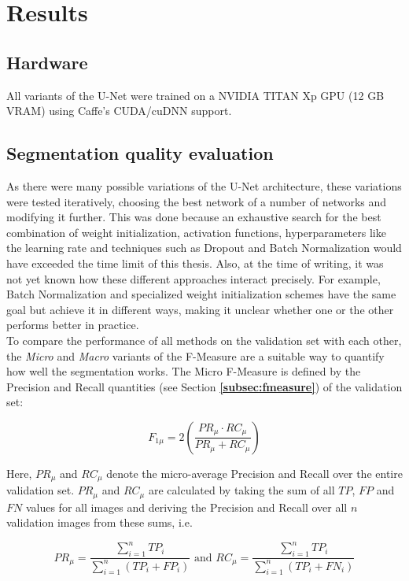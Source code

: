 \chapter {Results}
\label{chap:results}

	\section{Hardware}
All variants of the U-Net were trained on a NVIDIA TITAN Xp GPU (12 GB VRAM) using Caffe's CUDA/cuDNN support.

	\section {Segmentation quality evaluation}

\noindent As there were many possible variations of the U-Net architecture, these variations were tested iteratively, choosing the best network of a number of networks and modifying it further. This was done because an exhaustive search for the best combination of weight initialization, activation functions, hyperparameters like the learning rate and techniques such as Dropout and Batch Normalization would have exceeded the time limit of this thesis. Also, at the time of writing, it was not yet known how these different approaches interact precisely. For example, Batch Normalization and specialized weight initialization schemes have the same goal but achieve it in different ways, making it unclear whether one or the other performs better in practice.\\

\noindent To compare the performance of all methods on the validation set with each other, the \textit{Micro} and \textit{Macro} variants of the F-Measure \cite{micromacro} are a suitable way to quantify how well the segmentation works. The Micro F-Measure is defined by the Precision and Recall quantities (see Section \textbf{\ref{subsec:fmeasure}}) of the validation set:

\[ F_{1\mu} = 2 \left ( \frac{PR_\mu \cdot RC_\mu}{PR_\mu + RC_\mu} \right ) \]

\noindent Here, $PR_\mu$ and $RC_\mu$ denote the micro-average Precision and Recall over the entire validation set. $PR_\mu$ and $RC_\mu$ are calculated by taking the sum of all $TP$, $FP$ and $FN$ values for all images and deriving the Precision and Recall over all $n$ validation images from these sums, i.e.

\[ PR_\mu = \frac{\sum_{i=1}^{n} TP_i}{\sum_{i=1}^{n} (TP_i + FP_i)} \text{ and }  RC_\mu = \frac{\sum_{i=1}^{n} TP_i}{\sum_{i=1}^{n} (TP_i + FN_i)} \]

